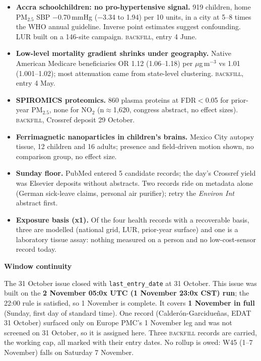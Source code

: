 \documentclass[10pt]{article}
\begin{document}
\footnotesize
\begin{itemize}

\item \textbf{Accra schoolchildren: no pro-hypertensive signal.} 919 children, home PM$_{2.5}$ SBP $-$0.70\,mmHg ($-$3.34 to 1.94) per 10 units, in a
city at 5--8 times the WHO annual guideline. Inverse point estimates suggest confounding. LUR built on a 146-site campaign. \textsc{backfill}, entry 4 June.

\item \textbf{Low-level mortality gradient shrinks under geography.} Native American Medicare beneficiaries OR 1.12 (1.06--1.18) per $\mu$g\,m$^{-3}$ vs
1.01 (1.001--1.02); most attenuation came from state-level clustering. \textsc{backfill}, entry 4 May.

\item \textbf{SPIROMICS proteomics.} 860 plasma proteins at FDR$<$0.05 for prior-year PM$_{2.5}$, none for NO$_2$ (n$\approx$1,620, congress abstract, no effect
sizes). \textsc{backfill}, Crossref deposit 29 October.

\item \textbf{Ferrimagnetic nanoparticles in children's brains.} Mexico City autopsy tissue, 12 children and 16 adults; presence and field-driven motion shown,
no comparison group, no effect size.

\item \textbf{Sunday floor.} PubMed entered 5 candidate records; the day's Crossref yield was Elsevier deposits without abstracts. Two records ride on metadata
alone (German sick-leave claims, personal air purifier); retry the \textit{Environ Int} abstract first.

\item \textbf{Exposure basis (x1).} Of the four health records with a recoverable basis, three are modelled (national grid, LUR, prior-year surface) and one is a laboratory tissue assay: nothing measured on a person and no low-cost-sensor record today.

\end{itemize}

\vspace{2mm}

\begin{keybox}
{\sffamily\bfseries\footnotesize\color{Deep}Window continuity}\\[1.2mm]
{\fontsize{7.2}{8.8}\selectfont
The 31 October issue closed with \texttt{last\_entry\_date} at 31 October. This issue was built on the \textbf{2 November 05:0x UTC (1 November 23:0x CST)
run}; the 22:00 rule is satisfied, so 1 November is complete. It covers \textbf{1 November in full} (Sunday, first day of standard time). One record (Calder\'on-Garcidue\~nas,
EDAT 31 October) surfaced only on Europe PMC's 1 November leg and was not screened on 31 October, so it is assigned here. Three \textsc{backfill} records are carried, the working
cap, all marked with their entry dates. No rollup is owed: W45 (1--7 November) falls on Saturday 7 November.\par}
\end{keybox}
\end{document}
